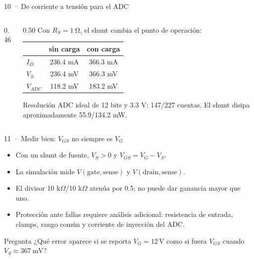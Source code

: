\documentclass[aspectratio=169]{beamer}
\begin{document}
\begin{frame}{10 · De corriente a tensión para el ADC}
  \begin{columns}[T]
    \begin{column}{0.46\textwidth}
    \end{column}
    \begin{column}{0.50\textwidth}
      \footnotesize
      Con $R_S=\SI{1}{\ohm}$, el shunt cambia el punto de operación:
      \begin{center}
      \begin{tabular}{@{}lcc@{}}
        \toprule
        & sin carga & con carga \\
        \midrule
        $I_D$ & 236.4 mA & 366.3 mA \\
        $V_S$ & 236.4 mV & 366.3 mV \\
        $V_{ADC}$ & 118.2 mV & 183.2 mV \\
        \bottomrule
      \end{tabular}
      \end{center}
      \begin{block}{Resolución}
        ADC ideal de 12 bits y 3.3 V: 147/227 cuentas. El shunt disipa
        aproximadamente 55.9/134.2 mW.
      \end{block}
    \end{column}
  \end{columns}
\end{frame}

\begin{frame}{11 · Medir bien: $V_{GS}$ no siempre es $V_G$}
  \begin{itemize}
    \item Con un shunt de fuente, $V_S>0$ y $V_{GS}=V_G-V_S$.
    \item La simulación mide $V(\text{gate},\text{sense})$ y
      $V(\text{drain},\text{sense})$.
    \item El divisor 10 k$\Omega$/10 k$\Omega$ atenúa por 0.5; no puede dar
      ganancia mayor que uno.
    \item Protección ante fallas requiere análisis adicional: resistencia de
      entrada, clamps, rango común y corriente de inyección del ADC.
  \end{itemize}
  \begin{alertblock}{Pregunta}
    ¿Qué error aparece si se reporta $V_G=12\,\mathrm{V}$ como si fuera
    $V_{GS}$ cuando $V_S\approx\SI{367}{\milli\volt}$?
  \end{alertblock}
\end{frame}
\end{document}
